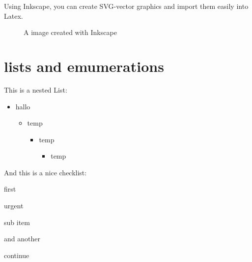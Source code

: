 \documentclass[	%
		fontsize=11pt,  %
		a4paper,	    %
		twoside,		%
		english,		%
		sans,			%
		f1				%
	]{HsH-report}		%
\begin{document}
	\pagebreak
	Using Inkscape, you can create SVG-vector graphics and import them easily into Latex.
	\begin{figure}
		\def\svgwidth{0.3\textwidth} %
		\graphicspath{{svg/}} %
		\caption{A image created with Inkscape}
		\label{subfig: svg}
	\end{figure}

\section{lists and emumerations}
	This is a nested List:
	\begin{itemize}
		\item hallo
		\begin{itemize}
			\item temp
			\begin{itemize}
				\item temp
				\begin{itemize}
					\item temp
				\end{itemize}
			\end{itemize}
		\end{itemize}
	\end{itemize}

	And this is a nice checklist:
	\begin{checklist}
		\item first
		\item urgent
		\begin{checklist}
			\item sub item
			\item and another
		\end{checklist}
		\item continue
	\end{checklist}
\end{document}
